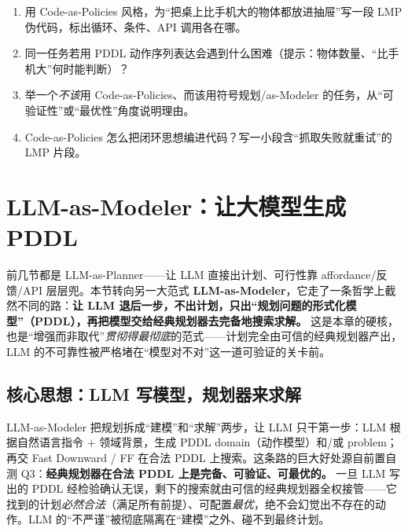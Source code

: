 \begin{exercise}
\begin{enumerate}
  \item 用 Code-as-Policies 风格，为“把桌上比手机大的物体都放进抽屉”写一段 LMP 伪代码，标出循环、条件、API 调用各在哪。
  \item 同一任务若用 PDDL 动作序列表达会遇到什么困难（提示：物体数量、“比手机大”何时能判断）？
  \item 举一个\emph{不该}用 Code-as-Policies、而该用符号规划/as-Modeler 的任务，从“可验证性”或“最优性”角度说明理由。
  \item Code-as-Policies 怎么把闭环思想编进代码？写一小段含“抓取失败就重试”的 LMP 片段。
\end{enumerate}
\end{exercise}

\section{LLM-as-Modeler：让大模型生成 PDDL}
\label{sec:llm-modeler}

前几节都是 LLM-as-Planner——让 LLM 直接出计划、可行性靠 affordance/反馈/API 层层兜。本节转向另一大范式 \textbf{LLM-as-Modeler}，它走了一条哲学上截然不同的路：\textbf{让 LLM 退后一步，不出计划，只出“规划问题的形式化模型”（PDDL），再把模型交给经典规划器去完备地搜索求解。} 这是本章的硬核，也是“增强而非取代”\emph{贯彻得最彻底}的范式——计划完全由可信的经典规划器产出，LLM 的不可靠性被严格堵在“模型对不对”这一道可验证的关卡前。

\subsection{核心思想：LLM 写模型，规划器来求解}
\label{sec:modeler-core}

LLM-as-Modeler 把规划拆成“建模”和“求解”两步，让 LLM 只干第一步：LLM 根据自然语言指令 $+$ 领域背景，生成 PDDL domain（动作模型）和/或 problem；再交 Fast Downward / FF 在合法 PDDL 上搜索。这条路的巨大好处源自前置自测 Q3：\textbf{经典规划器在合法 PDDL 上是完备、可验证、可最优的。} 一旦 LLM 写出的 PDDL 经检验确认无误，剩下的搜索就由可信的经典规划器全权接管——它找到的计划\emph{必然合法}（满足所有前提）、可配置\emph{最优}，绝不会幻觉出不存在的动作。LLM 的“不严谨”被彻底隔离在“建模”之外、碰不到最终计划。

